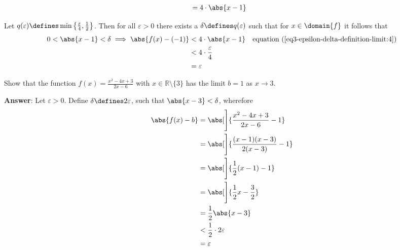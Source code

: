 \begin{exm}
\begin{flushleft}
\begin{align}
			             & =4\cdot\abs{x-1}\label{eq3-epsilon-delta-definition-limit:4}
		\end{align}
	\end{flushleft}
	Let $q(\varepsilon)\defines\min\left\{\tfrac{\varepsilon}{4},\tfrac{1}{2}\right\}$.
	Then for all $\varepsilon>0$ there exists a $\delta\defines q(\varepsilon)$ such that
	for $x\in\domain{f}$ it follows that
	\begin{align*}
		0<\abs{x-1}<\delta \implies \abs{f(x)-(-1)} & <4\cdot\abs{x-1}             &  & \text{\pref{equation}{eq3-epsilon-delta-definition-limit:4}} \\
		                                            & <4\cdot\frac{\varepsilon}{4}                                                                   \\
		                                            & =\varepsilon
	\end{align*}
\end{exm}

\begin{exm}\label{exm-epsilon-delta-definition-limit:4}
	Show that the function $f(x)=\tfrac{x^2-4x+3}{2x-6}$ with $x\in\mathbb{R}\setminus\{3\}$
	has the limit $b=1$ as $x\to3$.
	\begin{flushleft}
		\textbf{Answer}: Let $\varepsilon>0$. Define $\delta\defines2\varepsilon$,
		such that $\abs{x-3}<\delta$, wherefore
		\begin{align*}
			\abs{f(x)-b} & =\abs[\Bigg]{\frac{x^2-4x+3}{2x-6}-1}     \\
			             & =\abs[\Bigg]{\frac{(x-1)(x-3)}{2(x-3)}-1} \\
			             & =\abs[\Bigg]{\frac{1}{2}(x-1)-1}          \\
			             & =\abs[\Bigg]{\frac{1}{2}x-\frac{3}{2}}    \\
			             & =\frac{1}{2}\abs{x-3}                     \\
			             & <\frac{1}{2}\cdot2\varepsilon             \\
			             & =\varepsilon
		\end{align*}
	\end{flushleft}
\end{exm}

